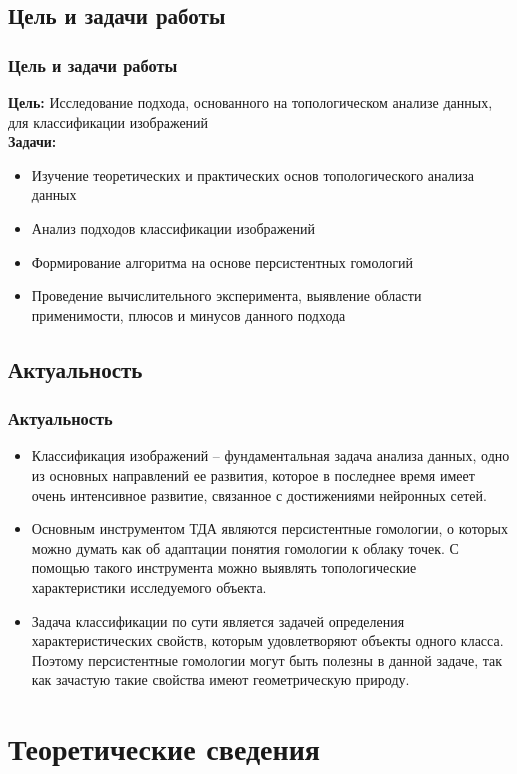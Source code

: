 \documentclass{beamer}
\begin{document}
		\subsection{Цель и задачи работы}
		\begin{frame}
		\frametitle{Цель и задачи работы}
			\textbf{\small Цель:} Исследование подхода, основанного на топологическом анализе данных, для классификации изображений \\[1em]
			\textbf{\small Задачи:}
			\begin{itemize}
				\item Изучение теоретических и практических основ топологического анализа данных
				\item Анализ подходов классификации изображений
				\item Формирование алгоритма на основе персистентных гомологий
				\item Проведение вычислительного эксперимента, выявление области применимости, плюсов и минусов данного подхода
			\end{itemize}
		\end{frame}
		\subsection{Актуальность}	
		\begin{frame}
		\frametitle{Актуальность}
			\begin{itemize}
				\item Классификация изображений -- фундаментальная задача анализа данных, одно из основных направлений ее развития, которое в последнее время имеет очень интенсивное развитие, связанное с достижениями нейронных сетей.
				\item Основным инструментом ТДА являются персистентные гомологии, о которых можно думать как об адаптации понятия гомологии к облаку точек. С помощью такого инструмента можно выявлять топологические характеристики исследуемого объекта.
				\item Задача классификации по сути является задачей определения характеристических свойств, которым удовлетворяют объекты одного класса. Поэтому персистентные гомологии могут быть полезны в данной задаче, так как зачастую такие свойства имеют геометрическую природу.
			\end{itemize}
	\end{frame}

	\section{Теоретические сведения}
	
\end{document}
